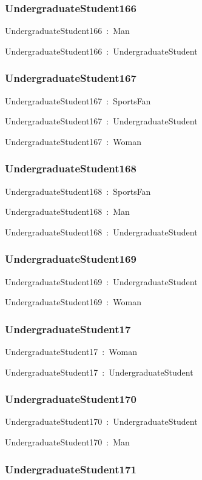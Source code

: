 \documentclass{article}
\begin{document}
\subsubsection*{UndergraduateStudent166}

UndergraduateStudent166~:~Man

UndergraduateStudent166~:~UndergraduateStudent

\subsubsection*{UndergraduateStudent167}

UndergraduateStudent167~:~SportsFan

UndergraduateStudent167~:~UndergraduateStudent

UndergraduateStudent167~:~Woman

\subsubsection*{UndergraduateStudent168}

UndergraduateStudent168~:~SportsFan

UndergraduateStudent168~:~Man

UndergraduateStudent168~:~UndergraduateStudent

\subsubsection*{UndergraduateStudent169}

UndergraduateStudent169~:~UndergraduateStudent

UndergraduateStudent169~:~Woman

\subsubsection*{UndergraduateStudent17}

UndergraduateStudent17~:~Woman

UndergraduateStudent17~:~UndergraduateStudent

\subsubsection*{UndergraduateStudent170}

UndergraduateStudent170~:~UndergraduateStudent

UndergraduateStudent170~:~Man

\subsubsection*{UndergraduateStudent171}
\end{document}
